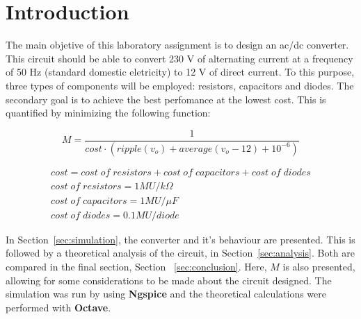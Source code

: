 \newpage

\section{Introduction}
\label{sec:introduction}


The main objetive of this laboratory assignment is to design an ac/dc converter. This circuit should be able to convert 230 V of alternating current at a frequency of 50 Hz (standard domestic eletricity) to 12 V of direct current. To this purpose, three types of components will be employed: resistors, capacitors and diodes. The secondary goal is to achieve the best perfomance at the lowest cost. This is quantified by minimizing the following function:

\begin{equation}
  M = \frac{1}{cost \cdot (ripple(v_o) + average(v_o-12) + 10^{-6})}
\end{equation}

\begin{gather*}
  cost = cost\;of\;resistors + cost\;of\;capacitors + cost\;of\;diodes \\
  cost\;of\;resistors = 1 MU/k\Omega \\
  cost\;of\;capacitors = 1 MU/\mu F \\
  cost\;of\;diodes = 0.1 MU/diode
\end{gather*}

In Section~\ref{sec:simulation}, the converter and it's behaviour are presented. This is followed by a theoretical analysis of the circuit, in Section~\ref{sec:analysis}. Both are compared in the final section, Section ~\ref{sec:conclusion}. Here, $M$ is also presented, allowing for some considerations to be made about the circuit designed. The simulation was run by using {\bf Ngspice} and the theoretical calculations were performed with {\bf Octave}.
